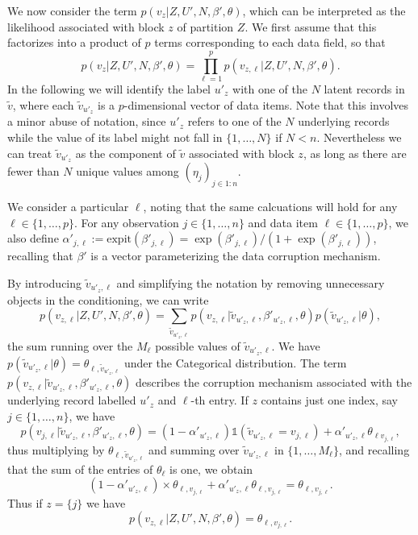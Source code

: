 \documentclass{article}
\begin{document}
We now consider the term $p(v_z|Z,U',N,\beta',\theta)$, which can be interpreted as the likelihood associated with block $z$ of partition $Z$.  We first assume that this factorizes into a product of $p$ terms corresponding to each data field, so that
\begin{equation}
p(v_z|Z,U',N,\beta',\theta) = \prod_{\ell=1}^p p(v_{z,\ell}|Z,U',N,\beta',\theta).
\label{eq:productoverfields}
\end{equation}
In the following we will identify the label $u'_z$ with one of the $N$ latent records in $\tilde{v}$, where each $\tilde{v}_{u'_z}$ is a $p$-dimensional vector of data items.
Note that this involves a minor abuse of notation, since $u'_z$ refers to one of the $N$ underlying records while the value of its label might not fall in $\{1,\ldots,N\}$ if $N < n$. Nevertheless we can 
treat $\tilde{v}_{u'_z}$ as the component of $\tilde{v}$ associated with block $z$, as long as there are fewer than $N$ 
unique values among $(\eta_j)_{j\in 1:n}$.

We consider a particular $\ell$, noting that the same calcuations will hold for any $\ell \in \{1, \dots, p\}$. 
For any observation $j \in  \{1, \dots, n\}$ and data item $\ell \in \{1, \dots, p\}$, we also 
define ${\alpha'_{j,\ell} := \text{expit}(\beta'_{j,\ell}) = \exp(\beta'_{j,\ell})/(1+\exp(\beta'_{j,\ell}))}$, recalling that $\beta'$ is a vector parameterizing the data corruption mechanism.

By introducing $\tilde{v}_{u'_z,\ell}$ and simplifying the notation by removing unnecessary objects in the conditioning, we can write
\begin{equation}
p(v_{z,\ell}|Z,U',N,\beta',\theta) = \sum_{\tilde{v}_{u'_z,\ell}}     
p(v_{z,\ell}|\tilde{v}_{u'_z,\ell},\beta'_{u'_z,\ell},\theta) p(\tilde{v}_{u'_z,\ell}|\theta),
\end{equation}
the sum running over the $M_\ell$ possible values of $\tilde{v}_{u'_z,\ell}$.
We have $p(\tilde{v}_{u'_z,\ell}|\theta) = \theta_{\ell,\tilde{v}_{u'_z,\ell}}$ under the Categorical distribution.
The term $p(v_{z,\ell}|\tilde{v}_{u'_z,\ell},\beta'_{u'_z,\ell},\theta)$ describes the corruption mechanism associated with the underlying record labelled $u'_z$ and $\ell$-th entry.
If $z$ contains just one index, say $j\in\{1,\ldots,n\}$,
we have 
\[
p(v_{j,\ell}|\tilde{v}_{u'_z,\ell},\beta'_{u'_z,\ell},\theta) = (1-\alpha'_{u'_z,\ell})\mathds{1}(\tilde{v}_{u'_z,\ell} = v_{j,\ell})
+ \alpha'_{u'_z,\ell} \theta_{\ell v_{j,\ell}},
\]
thus multiplying by $\theta_{\ell,\tilde{v}_{u'_z,\ell}}$ and summing over $\tilde{v}_{u'_z,\ell}$ in $\{1,\ldots,M_\ell\}$, and recalling
that the sum of the entries of $\theta_\ell$ is one, we obtain 
\[(1-\alpha'_{u'_z,\ell}) \times \theta_{\ell,v_{j,\ell}}
+ \alpha'_{u'_z,\ell} \theta_{\ell,v_{j,\ell}} = \theta_{\ell,v_{j,\ell}}.\]
Thus if $z = \{j\}$ we have 
\begin{equation}
p(v_{z,\ell}|Z,U',N,\beta',\theta) = \theta_{\ell,v_{j,\ell}}.
\label{eq:case_singleton}
\end{equation}
\end{document}
